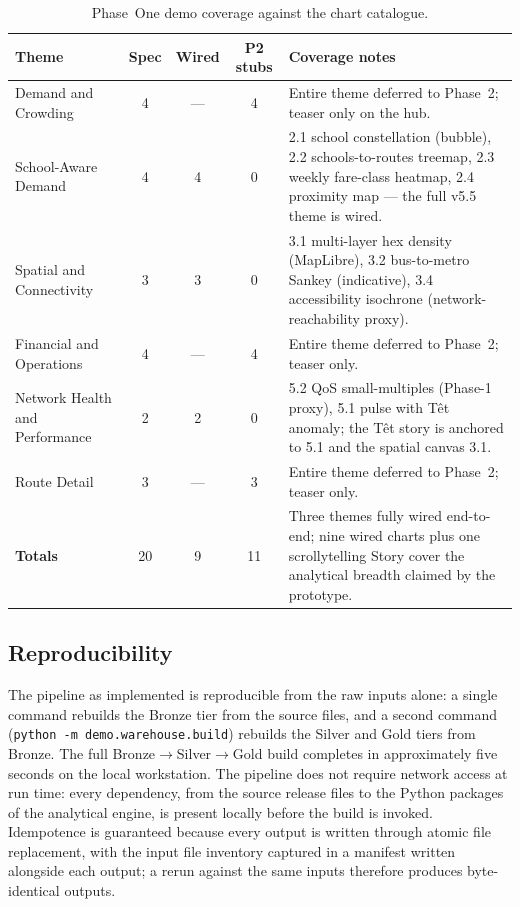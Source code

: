 \begin{table}[!htbp]
  \centering
  \caption{Phase~One demo coverage against the chart catalogue.}
  \label{tab:impl:surface_coverage}
  \footnotesize
  \renewcommand{\arraystretch}{1.25}
  \begin{tabularx}{\linewidth}{p{4.4cm}cccX}
    \hline
    \textbf{Theme} & \textbf{Spec} & \textbf{Wired} & \textbf{P2 stubs} & \textbf{Coverage notes} \\
    \hline
    Demand and Crowding            & 4 & --- & 4 & Entire theme deferred to Phase~2; teaser only on the hub. \\
    School-Aware Demand            & 4 & 4  & 0 & 2.1 school constellation (bubble), 2.2 schools-to-routes treemap, 2.3 weekly fare-class heatmap, 2.4 proximity map --- the full v5.5 theme is wired. \\
    Spatial and Connectivity       & 3 & 3  & 0 & 3.1 multi-layer hex density (MapLibre), 3.2 bus-to-metro Sankey (indicative), 3.4 accessibility isochrone (network-reachability proxy). \\
    Financial and Operations       & 4 & --- & 4 & Entire theme deferred to Phase~2; teaser only. \\
    Network Health and Performance & 2 & 2  & 0 & 5.2 QoS small-multiples (Phase-1 proxy), 5.1 pulse with T\^et anomaly; the T\^et story is anchored to 5.1 and the spatial canvas 3.1. \\
    Route Detail                   & 3 & --- & 3 & Entire theme deferred to Phase~2; teaser only. \\
    \hline
    \textbf{Totals}                & 20 & 9 & 11 & Three themes fully wired end-to-end; nine wired charts plus one scrollytelling Story cover the analytical breadth claimed by the prototype. \\
    \hline
  \end{tabularx}
\end{table}

\subsection{Reproducibility}
\label{sec:impl:pipeline:reproducibility}

The pipeline as implemented is reproducible from the raw inputs
alone: a single command rebuilds the Bronze tier from the source
files, and a second command (\texttt{python -m demo.warehouse.build})
rebuilds the Silver and Gold tiers from Bronze. The full
Bronze\(\rightarrow\)Silver\(\rightarrow\)Gold build completes in
approximately five seconds on the local workstation. The pipeline
does not require network access at run time: every dependency, from
the source release files to the Python packages of the analytical
engine, is present locally before the build is invoked. Idempotence
is guaranteed because every output is written through atomic file
replacement, with the input file inventory captured in a manifest
written alongside each output; a rerun against the same inputs
therefore produces byte-identical outputs.

